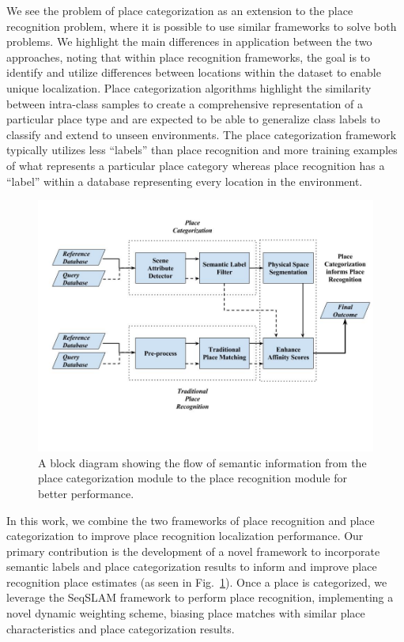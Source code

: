 \documentclass[letterpaper, 10 pt, conference]{ieeeconf}  %
\begin{document}
We see the problem of place categorization as an extension to the place recognition problem, where it is possible to use similar frameworks to solve both problems. We highlight the main differences in application between the two approaches, noting that within place recognition frameworks, the goal is to identify and utilize differences between locations within the dataset to enable unique localization. Place categorization algorithms highlight the similarity between intra-class samples to create a comprehensive representation of a particular place type and are expected to be able to generalize class labels to classify and extend to unseen environments. The place categorization framework typically utilizes less ``labels'' than place recognition and more training examples of what represents a particular place category whereas place recognition has a ``label'' within a database representing every location in the environment. 

\begin{figure}
	\includegraphics[clip, trim=1cm 4cm 0cm 2cm,scale=0.26]{flowchart}
	\caption{A block diagram showing the flow of semantic information from the place categorization module to the place recognition module for better performance.}
	\label{fig:flowchart}
\end{figure}


In this work, we combine the two frameworks of place recognition and place categorization to improve place recognition localization performance. Our primary contribution is the development of a novel framework to incorporate semantic labels and place categorization results to inform and improve place recognition place estimates (as seen in Fig.~\ref{fig:flowchart}).  
Once a place is categorized, we leverage the SeqSLAM framework to perform place recognition, implementing a novel dynamic weighting scheme, biasing place matches with similar place characteristics and place categorization results. 
\end{document}

